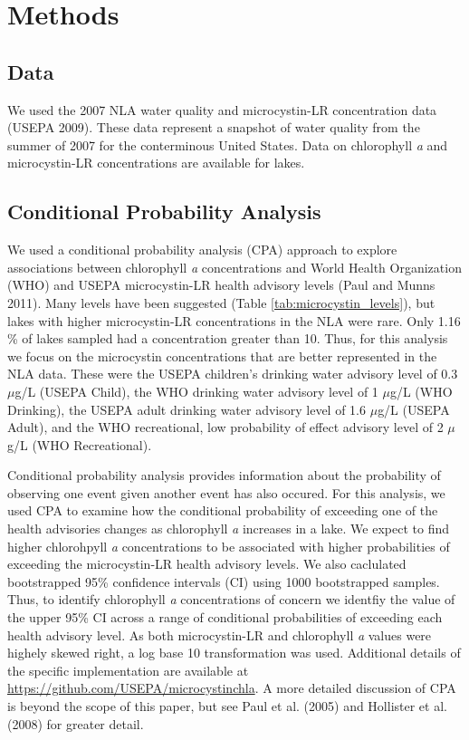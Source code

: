 \documentclass[11pt,]{article}
\begin{document}
\section{Methods}\label{methods}

\subsection{Data}\label{data}

We used the 2007 NLA water quality and microcystin-LR concentration data
(USEPA 2009). These data represent a snapshot of water quality from the
summer of 2007 for the conterminous United States. Data on chlorophyll
\emph{a} and microcystin-LR concentrations are available for lakes.

\subsection{Conditional Probability
Analysis}\label{conditional-probability-analysis}

We used a conditional probability analysis (CPA) approach to explore
associations between chlorophyll \emph{a} concentrations and World
Health Organization (WHO) and USEPA microcystin-LR health advisory
levels (Paul and Munns 2011). Many levels have been suggested (Table
\ref{tab:microcystin_levels}), but lakes with higher microcystin-LR
concentrations in the NLA were rare. Only 1.16 \% of lakes sampled had a
concentration greater than 10. Thus, for this analysis we focus on the
microcystin concentrations that are better represented in the NLA data.
These were the USEPA children's drinking water advisory level of 0.3
\(\mu\)g/L (USEPA Child), the WHO drinking water advisory level of 1
\(\mu\)g/L (WHO Drinking), the USEPA adult drinking water advisory level
of 1.6 \(\mu\)g/L (USEPA Adult), and the WHO recreational, low
probability of effect advisory level of 2 \(\mu\)g/L (WHO Recreational).

Conditional probability analysis provides information about the
probability of observing one event given another event has also occured.
For this analysis, we used CPA to examine how the conditional
probability of exceeding one of the health advisories changes as
chlorophyll \emph{a} increases in a lake. We expect to find higher
chlorohpyll \emph{a} concentrations to be associated with higher
probabilities of exceeding the microcystin-LR health advisory levels. We
also caclulated bootstrapped 95\% confidence intervals (CI) using 1000
bootstrapped samples. Thus, to identify chlorophyll \emph{a}
concentrations of concern we identfiy the value of the upper 95\% CI
across a range of conditional probabilities of exceeding each health
advisory level. As both microcystin-LR and chlorophyll \emph{a} values
were highely skewed right, a log base 10 transformation was used.
Additional details of the specific implementation are available at
\url{https://github.com/USEPA/microcystinchla}. A more detailed
discussion of CPA is beyond the scope of this paper, but see Paul et al.
(2005) and Hollister et al. (2008) for greater detail.
\end{document}
